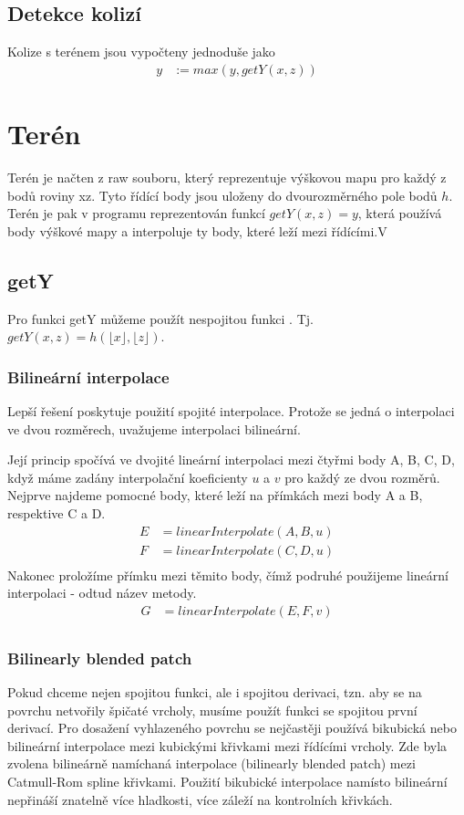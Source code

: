\documentclass{zcu_sp}
\begin{document}
\subsection{Detekce kolizí}
Kolize s terénem jsou vypočteny jednoduše jako 
\begin{align*}
y &:= max(y, getY(x, z))
\end{align*}


\section{Terén}
Terén je načten z raw souboru, který reprezentuje výškovou mapu pro každý z
bodů roviny xz. Tyto řídící body jsou uloženy do dvourozměrného pole bodů $h$.
Terén je pak v programu reprezentován funkcí $getY(x, z) = y$, která používá
body výškové mapy a interpoluje ty body, které leží mezi řídícími.V

\subsection{getY}
Pro funkci getY můžeme použít nespojitou funkci . Tj. $getY(x, z) =
h (\lfloor x \rfloor, \lfloor z \rfloor)$.

\subsubsection{Bilineární interpolace}
Lepší řešení poskytuje použití spojité interpolace. Protože se jedná o
interpolaci ve dvou rozměrech, uvažujeme interpolaci bilineární.

Její princip spočívá ve dvojité lineární interpolaci mezi čtyřmi body A, B, C,
D, když máme zadány interpolační koeficienty $u$ a $v$ pro každý ze dvou
rozměrů. Nejprve najdeme pomocné body, které leží na přímkách mezi body A a B,
respektive C a D.
\begin{align*}
E &= linearInterpolate(A, B, u) \\
F &= linearInterpolate(C, D, u) \\
\end{align*}
Nakonec proložíme přímku mezi těmito body, čímž podruhé použijeme lineární interpolaci - odtud název metody.
\begin{align*}
G &= linearInterpolate(E, F, v) \\
\end{align*}

\subsubsection{Bilinearly blended patch} 
Pokud chceme nejen spojitou funkci, ale i spojitou derivaci, tzn. aby se na
povrchu netvořily špičaté vrcholy, musíme použít funkci se spojitou první
derivací. Pro dosažení vyhlazeného povrchu se nejčastěji používá bikubická nebo
bilineární interpolace mezi kubickými křivkami mezi řídícími vrcholy. Zde byla
zvolena bilineárně namíchaná interpolace (bilinearly blended
patch)\cite{wikicoons}\cite{rose-hulman} mezi Catmull-Rom spline křivkami.
Použití bikubické interpolace namísto bilineární nepřináší znatelně více
hladkosti, více záleží na kontrolních křivkách.
\end{document}
